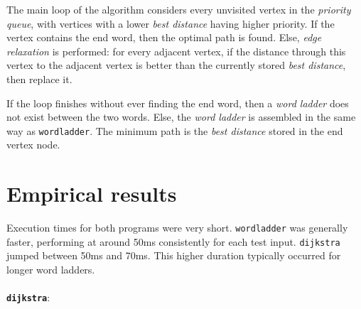 \documentclass{article}
\begin{document}
\begin{itemize}
    The main loop of the algorithm considers every unvisited vertex in the \textit{priority queue}, with vertices with a lower \textit{best distance} having higher priority. If the vertex contains the end word, then the optimal path is found. Else, \textit{edge relaxation} is performed: for every adjacent vertex, if the distance through this vertex to the adjacent vertex is better than the currently stored \textit{best distance}, then replace it.

    If the loop finishes without ever finding the end word, then a \textit{word ladder} does not exist between the two words. Else, the \textit{word ladder} is assembled in the same way as \texttt{wordladder}. The minimum path is the \textit{best distance} stored in the end vertex node.
\end{itemize}

\section*{Empirical results}

Execution times for both programs were very short. \texttt{wordladder} was generally faster, performing at around 50ms consistently for each test input. \texttt{dijkstra} jumped between 50ms and 70ms. This higher duration typically occurred for longer word ladders.
\\\\
\texttt{\textbf{dijkstra}}:
\end{document}
